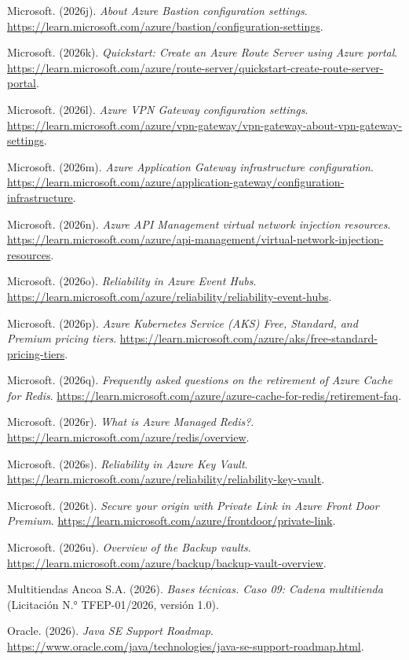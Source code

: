 \documentclass[11pt]{article}
\begin{document}
Microsoft. (2026j). \textit{About Azure Bastion configuration settings}. \url{https://learn.microsoft.com/azure/bastion/configuration-settings}.

Microsoft. (2026k). \textit{Quickstart: Create an Azure Route Server using Azure portal}. \url{https://learn.microsoft.com/azure/route-server/quickstart-create-route-server-portal}.

Microsoft. (2026l). \textit{Azure VPN Gateway configuration settings}. \url{https://learn.microsoft.com/azure/vpn-gateway/vpn-gateway-about-vpn-gateway-settings}.

Microsoft. (2026m). \textit{Azure Application Gateway infrastructure configuration}. \url{https://learn.microsoft.com/azure/application-gateway/configuration-infrastructure}.

Microsoft. (2026n). \textit{Azure API Management virtual network injection resources}. \url{https://learn.microsoft.com/azure/api-management/virtual-network-injection-resources}.

Microsoft. (2026o). \textit{Reliability in Azure Event Hubs}. \url{https://learn.microsoft.com/azure/reliability/reliability-event-hubs}.

Microsoft. (2026p). \textit{Azure Kubernetes Service (AKS) Free, Standard, and Premium pricing tiers}. \url{https://learn.microsoft.com/azure/aks/free-standard-pricing-tiers}.

Microsoft. (2026q). \textit{Frequently asked questions on the retirement of Azure Cache for Redis}. \url{https://learn.microsoft.com/azure/azure-cache-for-redis/retirement-faq}.

Microsoft. (2026r). \textit{What is Azure Managed Redis?}. \url{https://learn.microsoft.com/azure/redis/overview}.

Microsoft. (2026s). \textit{Reliability in Azure Key Vault}. \url{https://learn.microsoft.com/azure/reliability/reliability-key-vault}.

Microsoft. (2026t). \textit{Secure your origin with Private Link in Azure Front Door Premium}. \url{https://learn.microsoft.com/azure/frontdoor/private-link}.

Microsoft. (2026u). \textit{Overview of the Backup vaults}. \url{https://learn.microsoft.com/azure/backup/backup-vault-overview}.

Multitiendas Ancoa S.A. (2026). \textit{Bases técnicas. Caso 09: Cadena multitienda} (Licitación N.° TFEP-01/2026, versión 1.0).

Oracle. (2026). \textit{Java SE Support Roadmap}. \url{https://www.oracle.com/java/technologies/java-se-support-roadmap.html}.
\end{document}
